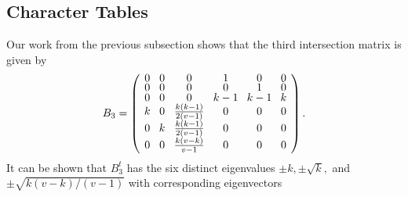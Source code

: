 \documentclass[../../../main]{subfiles}
\begin{document}
 \dinkus

\subsection{Character Tables}

Our work from the previous subsection shows that the third intersection matrix is given by
\[
 B_3 =
 \arraycolsep=4.0pt\def\arraystretch{0.625}
 \left(\begin{array}{cccccc}
  0 & 0 & 0 & 1 & 0 & 0 \\
  0 & 0 & 0 & 0 & 1 & 0 \\
  0 & 0 & 0 & k-1 & k-1 & k \\
  k & 0 & \frac{k(k-1)}{2(v-1)} & 0 & 0 & 0 \\
  0 & k & \frac{k(k-1)}{2(v-1)} & 0 & 0 & 0 \\
  0 & 0 & \frac{k(v-k)}{v-1} & 0 & 0 & 0
 \end{array}\right).
\]
It can be shown that $B_3^t$ has the six distinct eigenvalues $\pm k, \pm\sqrt{k},$ and $\pm\sqrt{k(v-k)/(v-1)}$ with corresponding eigenvectors
\end{document}
